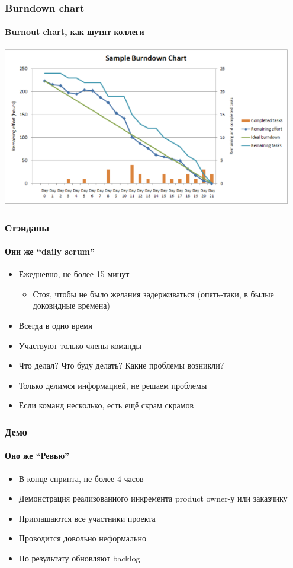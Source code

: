 \documentclass{../../slides-style}
\begin{document}
    \begin{frame}
        \frametitle{Burndown chart}
        \framesubtitle{Burnout chart, как шутят коллеги}
        \begin{center}
            \includegraphics[width=0.95\textwidth]{burndown.png}
        \end{center}
    \end{frame}

    \begin{frame}
        \frametitle{Стэндапы}
        \framesubtitle{Они же ``daily scrum''}
        \begin{itemize}
            \item Ежедневно, не более 15 минут
            \begin{itemize}
                \item Стоя, чтобы не было желания задерживаться (опять-таки, в былые доковидные времена)
            \end{itemize}
            \item Всегда в одно время
            \item Участвуют только члены команды
            \item Что делал? Что буду делать? Какие проблемы возникли?
            \item Только делимся информацией, не решаем проблемы
            \item Если команд несколько, есть ещё скрам скрамов
        \end{itemize}
    \end{frame}

    \begin{frame}
        \frametitle{Демо}
        \framesubtitle{Оно же ``Ревью''}
        \begin{itemize}
            \item В конце спринта, не более 4 часов
            \item Демонстрация реализованного инкремента product owner-у или заказчику
            \item Приглашаются все участники проекта
            \item Проводится довольно неформально
            \item По результату обновляют backlog
        \end{itemize}
    \end{frame}
\end{document}
